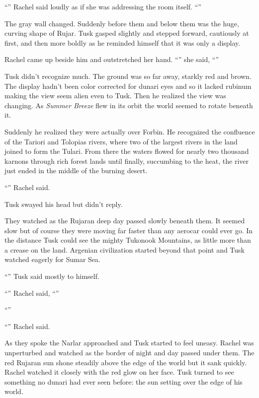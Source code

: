 ``'' Rachel said loudly as if she was addressing the room itself. ``''

The gray wall changed. Suddenly before them and below them was the huge, curving shape of Rujar.
Tusk gasped slightly and stepped forward, cautiously at first, and then more boldly as he
reminded himself that it was only a display.

Rachel came up beside him and outstretched her hand. ``'' she said,
``''

Tusk didn't recognize much. The ground was so far away, starkly red and brown. The display
hadn't been color corrected for dunari eyes and so it lacked rubinum making the view seem alien
even to Tusk. Then he realized the view was changing. As \textit{Summer Breeze} flew in its
orbit the world seemed to rotate beneath it.

Suddenly he realized they were actually over Forbin. He recognized the confluence of the Tariori
and Tolopias rivers, where two of the largest rivers in the land joined to form the Tulari. From
there the waters flowed for nearly two thousand karnons through rich forest lands until finally,
succumbing to the heat, the river just ended in the middle of the burning desert.

``'' Rachel said.

Tusk swayed his head but didn't reply.

They watched as the Rujaran deep day passed slowly beneath them. It seemed slow but of course
they were moving far faster than any aerocar could ever go. In the distance Tusk could see the
mighty Tukonook Mountains, as little more than a crease on the land. Argenian civilization
started beyond that point and Tusk watched eagerly for Sumar Sea.

``'' Tusk said mostly to himself.

``'' Rachel said, ``''

``''

``'' Rachel said.

As they spoke the Narlar approached and Tusk started to feel uneasy. Rachel was unperturbed and
watched as the border of night and day passed under them. The red Rujaran sun shone steadily
above the edge of the world but it sank quickly. Rachel watched it closely with the red glow on
her face. Tusk turned to see something no dunari had ever seen before: the sun setting over the
edge of his world.

